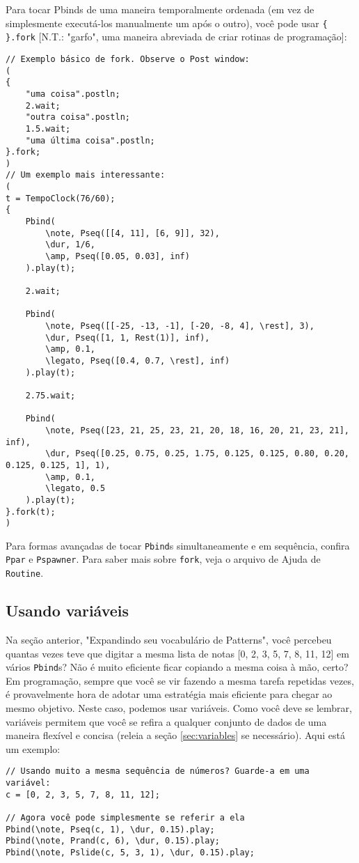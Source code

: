 Para tocar Pbinds de uma maneira temporalmente ordenada (em vez de simplesmente executá-los manualmente um após o outro), você pode usar \texttt{\{ \}.fork} [N.T.: "garfo", uma maneira abreviada de criar rotinas de programação]:

\begin{lstlisting}[style=SuperCollider-IDE, basicstyle=\scttfamily\footnotesize]
// Exemplo básico de fork. Observe o Post window:
( 
{
	"uma coisa".postln;
	2.wait;
	"outra coisa".postln;
	1.5.wait;
	"uma última coisa".postln;
}.fork;
)
// Um exemplo mais interessante:
(
t = TempoClock(76/60);
{
	Pbind(
		\note, Pseq([[4, 11], [6, 9]], 32),
		\dur, 1/6,
		\amp, Pseq([0.05, 0.03], inf)
	).play(t);
	
	2.wait;
	
	Pbind(
		\note, Pseq([[-25, -13, -1], [-20, -8, 4], \rest], 3),
		\dur, Pseq([1, 1, Rest(1)], inf),
		\amp, 0.1,
		\legato, Pseq([0.4, 0.7, \rest], inf)
	).play(t);

	2.75.wait;
	
	Pbind(
		\note, Pseq([23, 21, 25, 23, 21, 20, 18, 16, 20, 21, 23, 21], inf),
		\dur, Pseq([0.25, 0.75, 0.25, 1.75, 0.125, 0.125, 0.80, 0.20, 0.125, 0.125, 1], 1),
		\amp, 0.1,
		\legato, 0.5
	).play(t);
}.fork(t);
)
\end{lstlisting}
 
Para formas avançadas de tocar \texttt{Pbind}s simultaneamente e em sequência, confira \texttt{Ppar} e \texttt{Pspawner}. Para saber mais sobre \texttt{fork}, veja o arquivo de Ajuda de  \texttt{Routine}.

\subsection{Usando variáveis}

Na seção anterior, "Expandindo seu vocabulário de Patterns", você percebeu quantas vezes teve que digitar a mesma lista de notas [0, 2, 3, 5, 7, 8, 11, 12] em vários \texttt{Pbind}s? Não é muito eficiente ficar copiando a mesma coisa à mão, certo? Em programação, sempre que você se vir fazendo a mesma tarefa repetidas vezes, é provavelmente hora de adotar uma estratégia mais eficiente para chegar ao mesmo objetivo. Neste caso, podemos usar variáveis. Como você deve se lembrar, variáveis permitem que você se refira a qualquer conjunto de dados de uma maneira flexível e concisa (releia a seção \ref{sec:variables} se necessário). Aqui está um exemplo:

\begin{lstlisting}[style=SuperCollider-IDE, basicstyle=\scttfamily\footnotesize]
// Usando muito a mesma sequência de números? Guarde-a em uma variável:
c = [0, 2, 3, 5, 7, 8, 11, 12];

// Agora você pode simplesmente se referir a ela
Pbind(\note, Pseq(c, 1), \dur, 0.15).play;
Pbind(\note, Prand(c, 6), \dur, 0.15).play;
Pbind(\note, Pslide(c, 5, 3, 1), \dur, 0.15).play;
\end{lstlisting}
 

